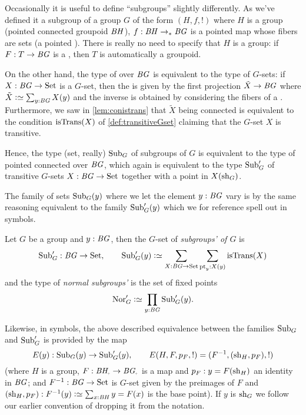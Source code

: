 Occasionally it is useful to define ``subgroups'' slightly differently.
As we've defined it a subgroup of a group $G$ of the form $(H,f,!)$ where $H$ is a group (pointed connected groupoid  $\mathit{B}\mathit{H}$), $f:\mathit{B}\mathit{H}\to_* \mathit{B}\mathit{G}$ is a pointed map whose fibers are sets (a pointed \covering).  There is really no need to specify that $H$ is a group: if $F:T\to \mathit{B}\mathit{G}$ is a \covering, then $T$ is automatically a groupoid.  

On the other hand,  the type of \coverings over $\mathit{B}\mathit{G}$ is equivalent to the type of $G$-sets: if $X:\mathit{B}\mathit{G}\to\mathrm{Set}$ is a $G$-set, then the \covering is given by the first projection $\tilde X\to \mathit{B}\mathit{G}$ where $\tilde X\defequi\sum_{y:\BG}X(y)$ and the inverse is obtained by considering the fibers of a \covering.  Furthermore, we saw in \cref{lem:conistrans} that $\tilde X$ being connected is equivalent to the condition $\istrans(X)$ of \cref{def:transitiveGset} claiming that the $G$-set $X$ is transitive. 

Hence, the type (set, really) $\mathrm{Sub}_G$ of subgroups of $G$ is equivalent to the type of pointed connected \coverings over $\mathit{B}\mathit{G}$, which again is equivalent to the type $\mathrm{Sub}_G'$ of transitive $G$-sets $X:\mathit{B}\mathit{G}\to\mathrm{Set}$ together with a point in $X(\mathrm{sh}_G)$.  

The family of sets $\mathrm{Sub}_G(y)$ where we let the element $y:\mathit{B}\mathit{G}$ vary is by the same reasoning equivalent to the family $\mathrm{Sub}_G'(y)$ which we for reference spell out in symbols.

\begin{definition}
  Let $G$ be a group and $y:\mathit{B}\mathit{G}$, then the $G$-set of \emph{subgroups' of $G$} is
  $$\typesubgroup_G':\BG\to\Set,\qquad\typesubgroup_G'(y)\defequi\sum_{X:\BG\to\Set}\sum_{\pt_y:X(y)}\mathrm{isTrans}(X)$$
and the type of \emph{normal subgroups'} is the set of fixed points
$$\typenormal_G'\defequi\prod_{y:\BG}\typesubgroup_G'(y).$$
\end{definition}
Likewise, in symbols, the above described equivalence between the families $\mathrm{Sub}_G$ and $\mathrm{Sub}_G'$ is provided by the map 
$$E(y):\mathrm{Sub}_G(y)\to\mathrm{Sub}_G'(y),\qquad E(H,F,p_F,!)=(F^{-1}, (\mathrm{sh}_H,p_F),!)
$$
(where $H$ is a group, $F:\BH_\div\to \BG_\div$ is a map and $p_F:y=F(\mathrm{sh}_H)$ an identity in $\mathit{B}\mathit{G}$; and $F^{-1}:\mathit{B}\mathit{G}\to\mathrm{Set}$ is $G$-set given by the preimages of $F$ and $(\sh_H,p_F):F^{-1}(y)\defequi \sum_{x:\BH}y=F(x)$ is the base point).  If $y$ is $\mathrm{sh}_G$ we follow our earlier convention of dropping it from the notation.


